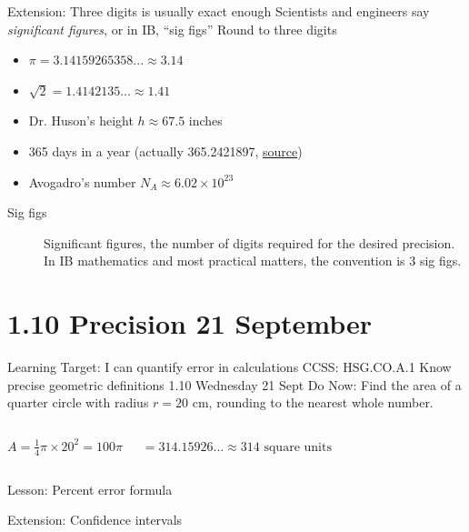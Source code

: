 \documentclass[onlytextwidth]{beamer}
\begin{document}
\begin{frame}{Extension: Three digits is usually exact enough}
    {Scientists and engineers say \emph{significant figures}, or in IB, ``sig figs''}
    Round to three digits
    \begin{itemize}
        \item $\pi = 3.14159265358... \approx 3.14$
        \item $\sqrt{2}= 1.4142135... \approx 1.41$
        \item Dr. Huson's height $h \approx 67.5$ inches
        \item 365 days in a year (actually 365.2421897, \href{https://www.math.net/days-in-a-year}{source})
        \item Avogadro's number $N_A \approx 6.02 \times 10^{23}$
    \end{itemize} \vspace{1cm}
    \begin{description}
        \item[Sig figs] Significant figures, the number of digits required for the desired precision. In IB mathematics and most practical matters, the convention is 3 sig figs.
    \end{description}
    \end{frame}


\section{1.10 Precision \hfill 21 September}
\begin{frame}{Learning Target: I can quantify error in calculations}
    {CCSS: HSG.CO.A.1 Know precise geometric definitions \hfill \alert{1.10 Wednesday 21 Sept}}
        Do Now: Find the area of a quarter circle with radius $r=20$ cm, rounding to the nearest whole number. \par \bigskip
        \begin{columns}
            $A = \frac{1}{4} \pi \times 20^2 = 100 \pi$ \par \bigskip
            $= 314.15926... \approx 314 \text{ square units}$
        \end{columns} \vspace{1cm}
        Lesson: Percent error formula \par \medskip
        Extension: Confidence intervals
    \end{frame}  
\end{document}
